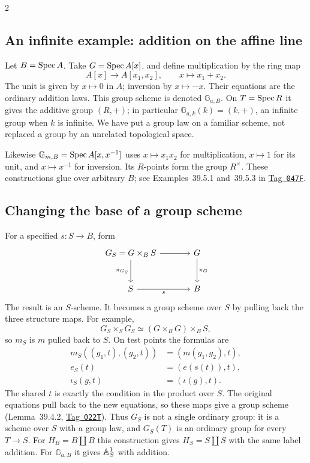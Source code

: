 \documentclass[12pt]{memoir}
\newcommand{\BGtag}[1]{\href{https://stacks.math.columbia.edu/tag/#1}{Tag~\texttt{#1}}}
\begin{document}
\begin{multicols}{2}
\subsection{An infinite example: addition on the affine line}
Let $B=\operatorname{Spec} A$. Take $G=\operatorname{Spec} A[x]$, and define multiplication
by the ring map
\[
 A[x]\longrightarrow A[x_1,x_2],\qquad x\longmapsto x_1+x_2.
\]
The unit is given by $x\mapsto0$ in $A$; inversion by $x\mapsto-x$.
Their equations are the ordinary addition laws. This group scheme is
denoted $\mathbb G_{a,B}$. On $T=\operatorname{Spec} R$ it gives the additive group
$(R,+)$; in particular $\mathbb G_{a,k}(k)=(k,+)$, an infinite group
when $k$ is infinite. We have put a group law on a familiar scheme,
not replaced a group by an unrelated topological space.

Likewise $\mathbb G_{m,B}=\operatorname{Spec} A[x,x^{-1}]$ uses $x\mapsto x_1x_2$
for multiplication, $x\mapsto1$ for its unit, and $x\mapsto x^{-1}$
for inversion. Its $R$-points form the group $R^\times$. These
constructions glue over arbitrary $B$; see Examples~39.5.1 and~39.5.3
in \BGtag{047F}.

\subsection{Changing the base of a group scheme}
For a specified $s:S\to B$, form
\[
\begin{tikzcd}[column sep=large,row sep=large]
G_S=G\times_B S \arrow[r] \arrow[d,"\pi_{G_S}"']
 &G \arrow[d,"\pi_G"]\\
S \arrow[r,"s"'] &B
\end{tikzcd}
\]
The result is an $S$-scheme. It becomes a group scheme over $S$ by
pulling back the three structure maps. For example,
\[
 G_S\times_S G_S\simeq(G\times_B G)\times_B S,
\]
so $m_S$ is $m$ pulled back to $S$. On test points the formulas are
\[
\begin{aligned}
 m_S((g_1,t),(g_2,t))&=(m(g_1,g_2),t),\\
 e_S(t)&=(e(s(t)),t),\\
 \iota_S(g,t)&=(\iota(g),t).
\end{aligned}
\]
The shared $t$ is exactly the condition in the product over $S$.
The original equations pull back to the new equations, so these maps
give a group scheme (Lemma~39.4.2, \BGtag{022T}). Thus $G_S$ is not a
single ordinary group: it is a scheme over $S$ with a group law, and
$G_S(T)$ is an ordinary group for every $T\to S$.
For $H_B=B\amalg B$ this construction gives $H_S=S\amalg S$ with
the same label addition. For $\mathbb G_{a,B}$ it gives $\mathbb{A}^1_S$
with addition.


\end{multicols}
\end{document}
